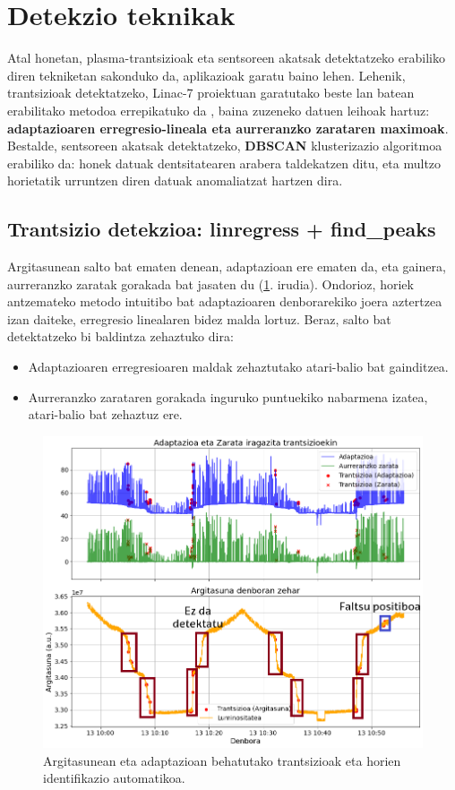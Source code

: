 \documentclass[12pt]{article}
\numberwithin{figure}{section}
\numberwithin{equation}{section}
\begin{document}
\section{Detekzio teknikak}
\label{sec:teknikak}
Atal honetan, plasma-trantsizioak eta sentsoreen akatsak detektatzeko erabiliko diren tekniketan sakonduko da, aplikazioak garatu baino lehen. Lehenik, trantsizioak detektatzeko, Linac-7 proiektuan garatutako beste lan batean erabilitako metodoa errepikatuko da \cite{fernandez_rua_clasificacion_2024}, baina zuzeneko datuen leihoak hartuz: \textbf{adaptazioaren erregresio-lineala eta aurreranzko zarataren maximoak}. Bestalde, sentsoreen akatsak detektatzeko, \textbf{DBSCAN} klusterizazio algoritmoa erabiliko da: honek datuak dentsitatearen arabera taldekatzen ditu, eta multzo horietatik urruntzen diren datuak anomaliatzat hartzen dira.

\subsection{Trantsizio detekzioa: linregress + find\_peaks }
\label{sec:linregress}

Argitasunean salto bat ematen denean, adaptazioan ere ematen da, eta gainera, aurreranzko zaratak gorakada bat jasaten du (\ref{fig:transitions_luminosity_adaptation}. irudia). Ondorioz, horiek antzemateko metodo intuitibo bat adaptazioaren denborarekiko joera aztertzea izan daiteke, erregresio linealaren bidez malda lortuz. Beraz, salto bat detektatzeko bi baldintza zehaztuko dira:

\begin{itemize}
    \item Adaptazioaren erregresioaren maldak zehaztutako atari-balio bat gainditzea.
    \item Aurreranzko zarataren gorakada inguruko puntuekiko nabarmena izatea, atari-balio bat zehaztuz ere.
\end{itemize}

\begin{figure}[h]
    \centering
    \includegraphics[width=0.8\linewidth]{4 - Detekzio teknikak/argitasuna_adaptazioa_saltoak.png}
    \caption{Argitasunean eta adaptazioan behatutako trantsizioak eta horien identifikazio automatikoa.}
    \label{fig:transitions_luminosity_adaptation}
\end{figure}
\end{document}
